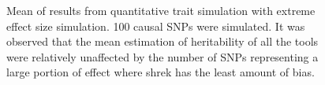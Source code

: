 \begin{figure}
{				
				\label{fig:ldscInQtEx100cMean}
			}
			\caption[Mean of Extreme Effect Size Simulation Result (100 Causal)]
			{Mean of results from quantitative trait simulation with extreme effect size simulation.
				100 causal \glspl{SNP} were simulated.
				It was observed that the mean estimation of heritability of all the tools were relatively unaffected by the number of \glspl{SNP} representing a large portion of effect where \gls{shrek} has the least amount of bias.
				} 
			\label{fig:QtEx100cMean}
		\end{figure}
		
